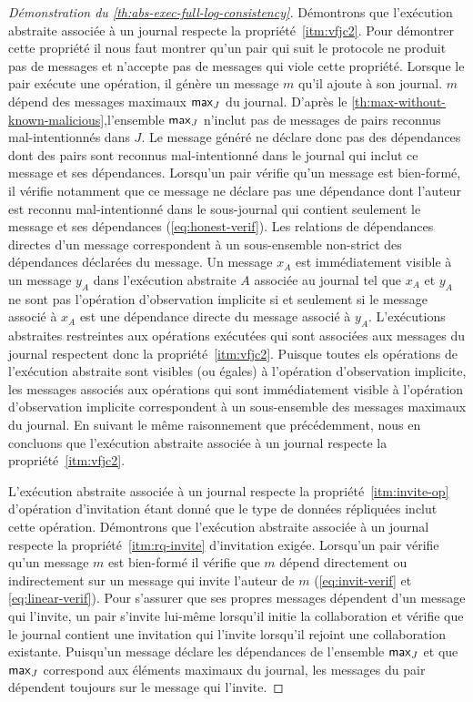 \begin{proof}[Démonstration du \autoref{th:abs-exec-full-log-consistency}]
Démontrons que l'exécution abstraite associée à un journal respecte la propriété~\ref{itm:vfjc2}.
Pour démontrer cette propriété il nous faut montrer qu'un pair qui suit le protocole ne produit pas de messages et n'accepte pas de messages qui viole cette propriété.
Lorsque le pair exécute une opération, il génère un message $m$ qu'il ajoute à son journal.
$m$ dépend des messages maximaux $\operatorname{\mathsf{max}}_J$ du journal.
D'après le \autoref{th:max-without-known-malicious},l'ensemble $\operatorname{\mathsf{max}}_J$ n'inclut pas de messages de pairs reconnus mal-intentionnés dans $J$.
Le message généré ne déclare donc pas des dépendances dont des pairs sont reconnus mal-intentionné dans le journal qui inclut ce message et ses dépendances.
Lorsqu'un pair vérifie qu'un message est bien-formé, il vérifie notamment que ce message ne déclare pas une dépendance dont l'auteur est reconnu mal-intentionné dans le sous-journal qui contient seulement le message et ses dépendances (\autoref{eq:honest-verif}).
Les relations de dépendances directes d'un message correspondent à un sous-ensemble non-strict des dépendances déclarées du message.
Un message $x_A$ est immédiatement visible à un message $y_A$ dans l'exécution abstraite $A$ associée au journal tel que $x_A$ et $y_A$ ne sont pas l'opération d'observation implicite si et seulement si le message associé à $x_A$ est une dépendance directe du message associé à $y_A$.
L'exécutions abstraites restreintes aux opérations exécutées qui sont associées aux messages du journal respectent donc la propriété~\ref{itm:vfjc2}.
Puisque toutes els opérations de l'exécution abstraite sont visibles (ou égales) à l'opération d'observation implicite, les messages associés aux opérations qui sont immédiatement visible à l'opération d'observation implicite correspondent à un sous-ensemble des messages maximaux du journal.
En suivant le même raisonnement que précédemment, nous en concluons que l'exécution abstraite associée à un journal respecte la propriété~\ref{itm:vfjc2}.

L'exécution abstraite associée à un journal respecte la propriété~\ref{itm:invite-op} d'opération d'invitation étant donné que le type de données répliquées inclut cette opération.
Démontrons que l'exécution abstraite associée à un journal respecte la propriété~\ref{itm:rq-invite} d'invitation exigée.
Lorsqu'un pair vérifie qu'un message $m$ est bien-formé il vérifie que $m$ dépend directement ou indirectement sur un message qui invite l'auteur de $m$ (\autoref{eq:invit-verif} et \autoref{eq:linear-verif}).
Pour s'assurer que ses propres messages dépendent d'un message qui l'invite, un pair s'invite lui-même lorsqu'il initie la collaboration et vérifie que le journal contient une invitation qui l'invite lorsqu'il rejoint une collaboration existante.
Puisqu'un message déclare les dépendances de l'ensemble $\operatorname{\mathsf{max}}_J$ et que $\operatorname{\mathsf{max}}_J$ correspond aux éléments maximaux du journal, les messages du pair dépendent toujours sur le message qui l'invite.


\end{proof}

